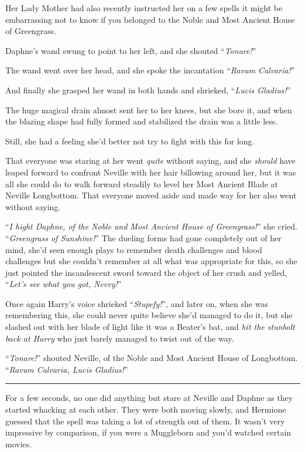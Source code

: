 Her Lady Mother had also recently instructed her on a few spells it might be embarrassing not to know if you belonged to the Noble and Most Ancient House of Greengrass.

Daphne's wand swung to point to her left, and she shouted ``\emph{Tonare!}''

The wand went over her head, and she spoke the incantation ``\emph{Ravum Calvaria!}''

And finally she grasped her wand in both hands and shrieked, ``\emph{Lucis Gladius!}''

The huge magical drain almost sent her to her knees, but she bore it, and when the blazing shape had fully formed and stabilized the drain was a little less.

Still, she had a feeling she'd better not try to fight with this for long.

That everyone was staring at her went \emph{quite} without saying, and she \emph{should} have leaped forward to confront Neville with her hair billowing around her, but it was all she could do to walk forward steadily to level her Most Ancient Blade at Neville Longbottom. That everyone moved aside and made way for her also went without saying.

``\emph{I hight Daphne, of the Noble and Most Ancient House of Greengrass!}'' she cried. ``\emph{Greengrass of Sunshine!}'' The dueling forms had gone completely out of her mind, she'd seen enough plays to remember death challenges and blood challenges but she couldn't remember at all what was appropriate for this, so she just pointed the incandescent sword toward the object of her crush and yelled, ``\emph{Let's see what you got, Nevvy!}''

Once again Harry's voice shrieked ``\emph{Stupefy!}'', and later on, when she was remembering this, she could never quite believe she'd managed to do it, but she slashed out with her blade of light like it was a Beater's bat, and \emph{hit the stunbolt back at Harry} who just barely managed to twist out of the way.

``\emph{Tonare!}'' shouted Neville, of the Noble and Most Ancient House of Longbottom. ``\emph{Ravum Calvaria, Lucis Gladius!}''

\begin{center}\rule{3in}{0.4pt}\end{center}

For a few seconds, no one did anything but stare at Neville and Daphne as they started whacking at each other. They were both moving slowly, and Hermione guessed that the spell was taking a lot of strength out of them. It wasn't very impressive by comparison, if you were a Muggleborn and you'd watched certain movies.

